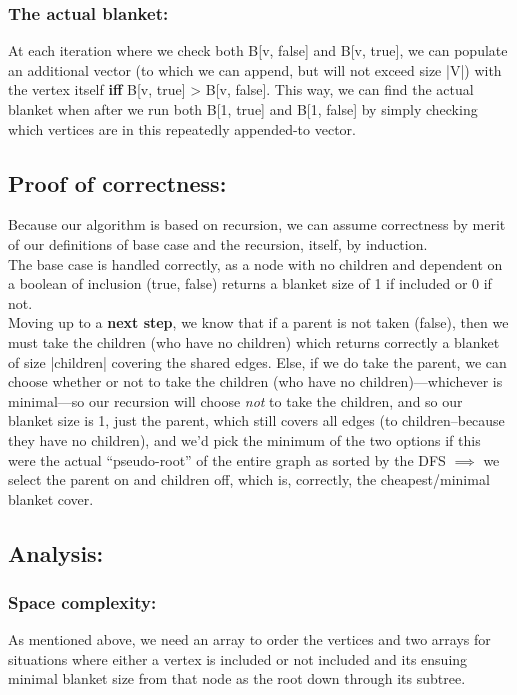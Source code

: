 \documentclass[conference]{styles/acmsiggraph}
\newcommand{\?}{\stackrel{?}{=}}
\begin{document}
\subsubsection{The actual blanket:} \label{theBlanket}
At each iteration where we check both B[v, false] and B[v, true], we can populate an additional vector (to which we can append, but will not exceed size |V|) with the vertex itself \textbf{iff} B[v, true] > B[v, false].  This way, we can find the actual blanket when after we run both B[1, true] and B[1, false] by simply checking which vertices are in this repeatedly appended-to vector.

\subsection{Proof of correctness:}
Because our algorithm is based on recursion, we can assume correctness by merit of our definitions of base case and the recursion, itself, by induction. \\

The base case is handled correctly, as a node with no children and dependent on a boolean of inclusion (true, false) returns a blanket size of 1 if included or 0 if not.\\

Moving up to a \textbf{next step}, we know that if a parent is not taken (false), then we must take the children (who have no children) which returns correctly a blanket of size |children| covering the shared edges.  Else, if we do take the parent, we can choose whether or not to take the children (who have no children)---whichever is minimal---so our recursion will choose \textit{not} to take the children, and so our blanket size is 1, just the parent, which still covers all edges (to children--because they have no children), and we'd pick the minimum of the two options if this were the actual \enquote{pseudo-root} of the entire graph as sorted by the DFS $\implies$ we select the parent on and children off, which is, correctly, the cheapest/minimal blanket cover.

\subsection{Analysis:}
\subsubsection*{Space complexity:}
As mentioned above, we need an array to order the vertices and two arrays for situations where either a vertex is included or not included and its ensuing minimal blanket size from that node as the root down through its subtree. \\
\end{document}
